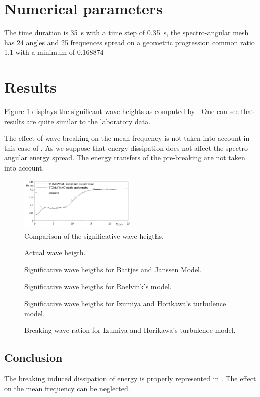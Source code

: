 \section{Numerical parameters}
%
The time duration is 35~s with a time step of 0.35~s, the spectro-angular mesh
has 24 angles and 25 frequences spread on a geometric progression common ratio
1.1 with a minimum of 0.168874
%
%
\section{Results}
%
Figure \ref{result_oldresult} displays the significant wave heights as computed by
\tomawac. One can see that \tomawac results are quite similar to the laboratory
data.

The effect of wave breaking on the mean frequency is not taken into account in
this case of \tomawac. As we suppose that energy dissipation does not affect the
spectro-angular energy spread. The energy transfers of the pre-breaking are
not taken into account.
\begin{figure} [!h]
\centering
\includegraphics[width=0.5\textwidth]{results.png}
 \caption{Comparison of the significative wave heigths.}
\label{result_oldresult}
\end{figure}

\begin{figure} [!h]
\centering
{}
 \caption{Actual wave heigth.}
\label{resultbj1}
\end{figure}

\begin{figure} [!h]
\centering
{}
 \caption{Significative wave heigths for Battjes and Janssen Model.}
\label{resultbj2}
\end{figure}
\begin{figure} [!h]
\centering
{}
 \caption{Significative wave heigths for Roelvink’s model.}
\label{resultro3}
\end{figure}
\begin{figure} [!h]
\centering
{}
\caption{Significative wave heigths for Izumiya and Horikawa’s turbulence
  model.}
\label{resultih4_hm0}
\end{figure}
\begin{figure} [!h]
\centering
{}
 \caption{Breaking wave ration for Izumiya and Horikawa’s turbulence model.}
\label{resultih4_beta}
\end{figure}
\subsection{Conclusion}
The breaking induced dissipation of energy is properly represented in \tomawac.
The effect on the mean frequency can be neglected.
